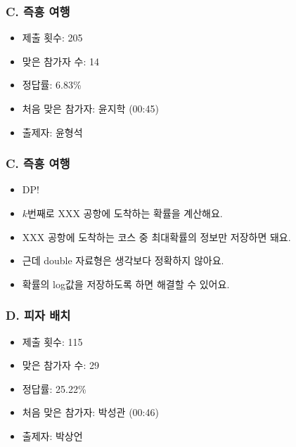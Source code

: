 \documentclass[xetex]{beamer}
\begin{document}
\begin{frame}
  \frametitle{C. 즉흥 여행}
  \begin{itemize}
    \item 제출 횟수: 205
    \item 맞은 참가자 수: 14
    \item 정답률: 6.83\%
    \item 처음 맞은 참가자: 윤지학 (00:45)
    \item 출제자: 윤형석
  \end{itemize}
\end{frame}

\begin{frame}
  \frametitle{C. 즉흥 여행}
  \begin{itemize}
    \item DP!
    \item $k$번째로 XXX 공항에 도착하는 확률을 계산해요.
    \item XXX 공항에 도착하는 코스 중 최대확률의 정보만 저장하면 돼요.
    \item 근데 double 자료형은 생각보다 정확하지 않아요.
    \item 확률의 log값을 저장하도록 하면 해결할 수 있어요.
  \end{itemize}
\end{frame}

\begin{frame}
  \frametitle{D. 피자 배치}
  \begin{itemize}
    \item 제출 횟수: 115
    \item 맞은 참가자 수: 29
    \item 정답률: 25.22\%
    \item 처음 맞은 참가자: 박성관 (00:46)
    \item 출제자: 박상언
  \end{itemize}
\end{frame}
\end{document}
